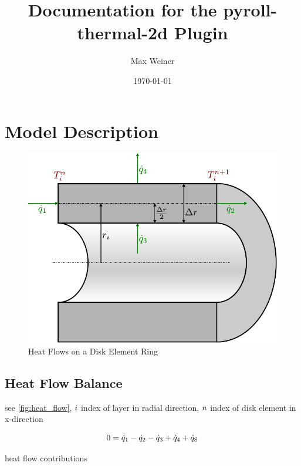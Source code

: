 \documentclass{scrartcl}
\begin{document}
    \title{Documentation for the pyroll-thermal-2d Plugin}
    \author{Max Weiner}
    \date{\today}

    \maketitle


    \section{Model Description}\label{sec:model-description}

    \begin{figure}
        \centering
        \includegraphics[scale=0.8]{img/heat_flow}
        \caption{Heat Flows on a Disk Element Ring}
        \label{fig:heat_flow}
    \end{figure}
    
    \subsection{Heat Flow Balance}

    see \autoref{fig:heat_flow}, ${i}$ index of layer in radial direction, ${n}$ index of disk element in x-direction

    \begin{equation}
        0 = {\dot{q}}_1 - {\dot{q}}_2 - {\dot{q}}_3 + {\dot{q}}_4 + {\dot{q}_\mathrm{S}}
        \label{eq:heat_flow_balance}
    \end{equation}
    
    heat flow contributions
\end{document}
